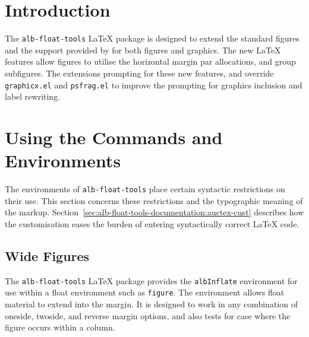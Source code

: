 \documentclass[11pt,a4paper,oneside,titlepage]{alb-corp}
\begin{document}

\section{Introduction}
\label{sec:alb-float-tools-documentation:intr}

The \texttt{alb-float-tools} \LaTeX{} package is designed to extend the
standard figures and the support provided by \AUCTeX{} for both figures
and graphics.  The new \LaTeX{} features allow figures to utilise the
horizontal margin par allocations, and group subfigures.  The \AUCTeX{}
extensions prompting for these new features, and override
\texttt{graphicx.el} and \texttt{psfrag.el} to improve the prompting for
graphics inclusion and label rewriting.




\section{Using the Commands and Environments}
\label{sec:alb-float-tools-documentation:using-comm-envir}

The environments of \texttt{alb-float-tools} place certain syntactic
restrictions on their use.  This section concerns these restrictions and
the typographic meaning of the markup.
Section~\ref{sec:alb-float-tools-documentation:auctex-cust} describes
how the \AUCTeX{} customisation eases the burden of entering
syntactically correct \LaTeX{} code.


\subsection{Wide Figures}
\label{sec:alb-float-tools-documentation:wide-figures}

The \texttt{alb-float-tools} \LaTeX{} package provides the
\texttt{albInflate} environment for use within a float environment such
as \texttt{figure}.  The environment allows float material to extend
into the margin.  It is designed to work in any combination of oneside,
twoside, and reverse margin options, and also tests for case where the
figure occurs within a column.
\end{document}
